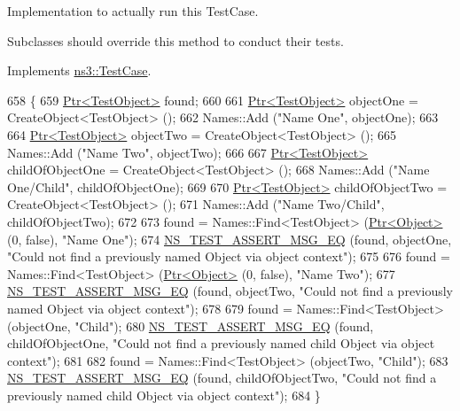 Implementation to actually run this Test\+Case. 

Subclasses should override this method to conduct their tests. 

Implements \hyperlink{classns3_1_1TestCase_a8ff74680cf017ed42011e4be51917a24}{ns3\+::\+Test\+Case}.


\begin{DoxyCode}
658 \{
659   \hyperlink{classns3_1_1Ptr}{Ptr<TestObject>} found;
660 
661   \hyperlink{classns3_1_1Ptr}{Ptr<TestObject>} objectOne = CreateObject<TestObject> ();
662   Names::Add (\textcolor{stringliteral}{"Name One"}, objectOne);
663 
664   \hyperlink{classns3_1_1Ptr}{Ptr<TestObject>} objectTwo = CreateObject<TestObject> ();
665   Names::Add (\textcolor{stringliteral}{"Name Two"}, objectTwo);
666 
667   \hyperlink{classns3_1_1Ptr}{Ptr<TestObject>} childOfObjectOne = CreateObject<TestObject> ();
668   Names::Add (\textcolor{stringliteral}{"Name One/Child"}, childOfObjectOne);
669 
670   \hyperlink{classns3_1_1Ptr}{Ptr<TestObject>} childOfObjectTwo = CreateObject<TestObject> ();
671   Names::Add (\textcolor{stringliteral}{"Name Two/Child"}, childOfObjectTwo);
672 
673   found = Names::Find<TestObject> (\hyperlink{classns3_1_1Ptr}{Ptr<Object>} (0, \textcolor{keyword}{false}), \textcolor{stringliteral}{"Name One"});
674   \hyperlink{group__testing_ga2a9d78cffb3db8e867c35fff0b698cf5}{NS\_TEST\_ASSERT\_MSG\_EQ} (found, objectOne, \textcolor{stringliteral}{"Could not find a previously named Object
       via object context"});
675 
676   found = Names::Find<TestObject> (\hyperlink{classns3_1_1Ptr}{Ptr<Object>} (0, \textcolor{keyword}{false}), \textcolor{stringliteral}{"Name Two"});
677   \hyperlink{group__testing_ga2a9d78cffb3db8e867c35fff0b698cf5}{NS\_TEST\_ASSERT\_MSG\_EQ} (found, objectTwo, \textcolor{stringliteral}{"Could not find a previously named Object
       via object context"});
678 
679   found = Names::Find<TestObject> (objectOne, \textcolor{stringliteral}{"Child"});
680   \hyperlink{group__testing_ga2a9d78cffb3db8e867c35fff0b698cf5}{NS\_TEST\_ASSERT\_MSG\_EQ} (found, childOfObjectOne, \textcolor{stringliteral}{"Could not find a previously named
       child Object via object context"});
681 
682   found = Names::Find<TestObject> (objectTwo, \textcolor{stringliteral}{"Child"});
683   \hyperlink{group__testing_ga2a9d78cffb3db8e867c35fff0b698cf5}{NS\_TEST\_ASSERT\_MSG\_EQ} (found, childOfObjectTwo, \textcolor{stringliteral}{"Could not find a previously named
       child Object via object context"});
684 \}
\end{DoxyCode}
